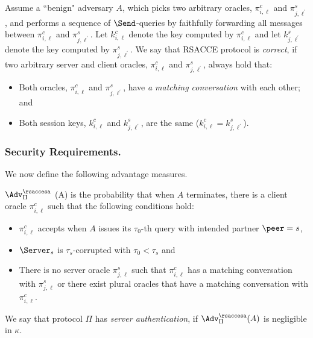\begin{definition}[Correctness]
 Assume a ``benign" adversary $A$, which picks two arbitrary oracles, $\pi^c_{i, \ell}$ and $\pi^s_{j, \ell^{\prime}}$,
 and performs a sequence of $\Send$-queries by faithfully forwarding all messages
 between $\pi^c_{i, \ell}$ and $\pi^s_{j, \ell^{\prime}}$.
 Let $k^c_{i, \ell}$ denote the key computed by $\pi^c_{i, \ell}$
 and let $k^s_{j, \ell^{\prime}}$ denote the key computed by $\pi^s_{j, \ell^{\prime}}$.
 We say that RSACCE protocol is \textit{correct}, if two arbitrary server and client oracles, $\pi^c_{i, \ell}$ and $\pi^s_{j, \ell^{\prime}}$, always hold that:
 \begin{itemize}
  \item{Both oracles, $\pi^c_{i, \ell}$ and $\pi^s_{j, \ell^{\prime}}$, have \textit{a matching conversation} with each other; and}
  \item{Both session keys, $k^c_{i, \ell}$ and $k^s_{j, \ell^{\prime}}$, are the same ($k^c_{i, \ell} = k^s_{j, \ell^{\prime}}$).}
 \end{itemize}
\end{definition}

\subsubsection{Security Requirements.}
We now define the following advantage measures.

\begin{definition} \label{def:rsacce-sa}
 $\Adv^{\rsaccesa}_{\Pi}$ (A) is the probability that when $A$ terminates, there is
 a client oracle $\pi^c_{i, \ell}$ such that the following conditions hold:
 \begin{itemize}
  \item{$\pi^c_{i, \ell}$ accepts when $A$ issues its $\tau_0$-th query with intended partner $\peer=s$, }
  \item{$\Server_s$ is $\tau_{s}$-corrupted with $\tau_0 < \tau_{s}$ and}
  \item{There is no server oracle $\pi^s_{j, \ell}$ such that $\pi^c_{i,\ell}$ has a matching conversation
  with $\pi^s_{j,\ell}$ or there exist plural oracles that have a matching conversation with $\pi^c_{i,\ell}$.}
 \end{itemize}
 We say that protocol $\Pi$ has \textit{server authentication}, if
 $\Adv^{\rsaccesa}_{\Pi}(A)$ is negligible in $\kappa$.
\end{definition}

